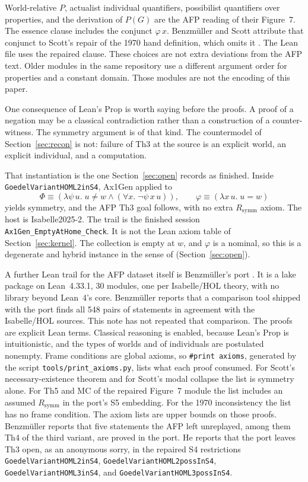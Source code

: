 \documentclass[11pt,a4paper]{article}
\newcommand{\lean}[1]{\texttt{#1}}
\theoremstyle{definition}
\theoremstyle{remark}
\begin{document}
World-relative \(P\), actualist individual quantifiers, possibilist
quantifiers over properties, and the derivation of \(P(G)\) are the AFP
reading of their Figure~7.
The essence clause includes the conjunct \(\varphi\,x\).
Benzm\"uller and Scott attribute that conjunct to Scott's repair of the 1970
hand definition, which omits it \cite{benzmuellerScott2025}.
The Lean file uses the repaired clause.
These choices are not extra deviations from the AFP text.
Older modules in the same repository use a different argument order for
properties and a constant domain.
Those modules are not the encoding of this paper.

One consequence of Lean's \textsf{Prop} is worth saying before the proofs.
A proof of a negation may be a classical contradiction rather than a
construction of a counter-witness.
The symmetry argument is of that kind.
The countermodel of Section~\ref{sec:recon} is not: failure of Th3 at the source
is an explicit world, an explicit individual, and a computation.

That instantiation is the one Section~\ref{sec:open} records as finished.
Inside \lean{GoedelVariantHOML2inS4}, Ax1Gen applied to
\[
  \Phi \equiv (\lambda\psi\,u.\; u \neq w \land (\forall x.\; \neg\psi\,x\,u)),
  \qquad
  \varphi \equiv (\lambda x\,u.\; u = w)
\]
yields symmetry, and the AFP Th3 goal follows, with no extra
\(R_{\mathrm{symm}}\) axiom.
The host is Isabelle2025-2.
The trail is the finished session \lean{Ax1Gen\_EmptyAtHome\_Check}.
It is not the Lean axiom table of Section~\ref{sec:kernel}.
The collection is empty at \(w\), and \(\varphi\) is a nominal, so this is
a degenerate and hybrid instance in the sense of \cite{benzmuellerPWN2026}
(Section~\ref{sec:open}).

A further Lean trail for the AFP dataset itself is Benzm\"uller's port
\cite{benzmuellerLean2026}.
It is a lake package on Lean~4.33.1, 30 modules, one per Isabelle/HOL theory,
with no library beyond Lean~4's core.
Benzm\"uller reports that a comparison tool shipped with the port finds all
548 pairs of statements in agreement with the Isabelle/HOL sources.
This note has not repeated that comparison.
The proofs are explicit Lean terms.
Classical reasoning is enabled, because Lean's \textsf{Prop} is
intuitionistic, and the types of worlds and of individuals are postulated
nonempty.
Frame conditions are global axioms, so \lean{\#print axioms}, generated by
the script \lean{tools/print\_axioms.py}, lists what each proof consumed.
For Scott's necessary-existence theorem and for Scott's modal collapse the
list is symmetry alone.
For Th5 and MC of the repaired Figure~7 module the list includes an assumed
\(R_{\mathrm{symm}}\) in the port's S5 embedding.
For the 1970 inconsistency the list has no frame condition.
The axiom lists are upper bounds on those proofs.
Benzm\"uller reports that five statements the AFP left unreplayed, among them
Th4 of the third variant, are proved in the port.
He reports that the port leaves Th3 open, as an anonymous sorry, in the
repaired S4 restrictions \lean{GoedelVariantHOML2inS4},
\lean{GoedelVariantHOML2possInS4}, \lean{GoedelVariantHOML3inS4}, and
\lean{GoedelVariantHOML3possInS4}.
\end{document}
